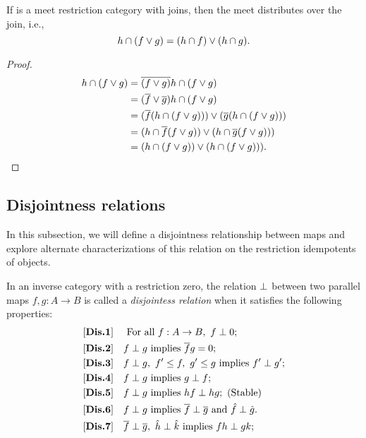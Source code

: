 \begin{lemma}\label{lem:meet_distributes_over_join}
  If \R is a meet restriction category with joins, then the meet distributes over the join, i.e.,
  \[
    h\cap(f\vee g) = (h\cap f)\vee (h\cap g).
  \]
\end{lemma}
\begin{proof}
  \begin{align*}
    h\cap(f\vee g) &= \overline{(f\vee g)} h\cap (f\vee g)\\
    &= (\overline{f}\vee \overline{g}) h\cap (f\vee g)\\
    &= (\overline{f}(h\cap (f\vee g))) \vee (\overline{g}(h\cap (f\vee g)))\\
    &= (h\cap \overline{f}(f\vee g)) \vee (h\cap \overline{g}(f\vee g)))\\
    &= (h\cap (f\vee g)) \vee (h\cap (f\vee g))).
  \end{align*}
\end{proof}


\subsection{Disjointness relations} %
\label{sub:disjointness_relations}
In this subsection, we will define a disjointness relationship between maps and
explore alternate characterizations of this relation on the restriction idempotents of objects.

\begin{definition}\label{def:disjointness_relation}
  In an inverse category \X with a restriction zero, the relation $\perp$ between two parallel
  maps $f, g:A \to B$ is called a \emph{disjointess relation} when it satisfies the following
  properties:
  \begin{align*}
    \axiom{Dis}{1}\quad &\text{ For all }f:A\to B,\ f\cdperp 0;\\
    \axiom{Dis}{2}\quad &f\cdperp g\text{ implies }\rst{f} g = 0; \\
    \axiom{Dis}{3}\quad &f\cdperp g,\ f' \le f,\ g' \le g\text{ implies }f' \cdperp g';\\
    \axiom{Dis}{4}\quad &f\cdperp g\text{ implies }g \cdperp f;\\
    \axiom{Dis}{5}\quad &f\cdperp g\text{ implies }h f \cdperp h g; \text{ (Stable)}\\
    \axiom{Dis}{6}\quad &f\cdperp g\text{ implies }\rst{f} \cdperp \rst{g}
      \text{ and }\rg{f}\cdperp\rg{g}.\\
    \axiom{Dis}{7}\quad &\rst{f}\cdperp \rst{g},\ \rg{h}\cdperp \rg{k}\text{ implies }f h
      \cdperp g k;
  \end{align*}
\end{definition}

